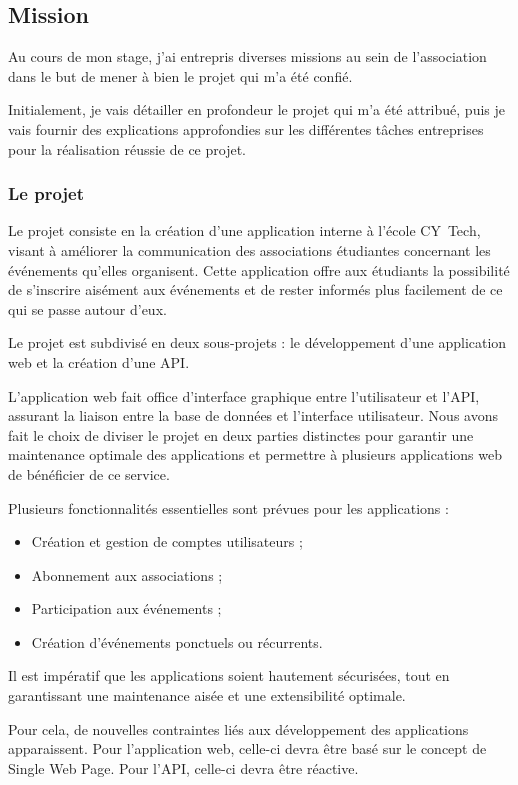 \subsection{Mission}

Au cours de mon stage, j'ai entrepris diverses missions au sein de l'association dans le but de mener à bien le projet qui m'a été confié.

Initialement, je vais détailler en profondeur le projet qui m'a été attribué, puis je vais fournir des explications approfondies sur les différentes tâches entreprises pour la réalisation réussie de ce projet.

\subsubsection{Le projet}

Le projet consiste en la création d'une application interne à l'école CY~Tech, visant à améliorer la communication des associations étudiantes concernant les événements qu'elles organisent. Cette application offre aux étudiants la possibilité de s'inscrire aisément aux événements et de rester informés plus facilement de ce qui se passe autour d'eux.

Le projet est subdivisé en deux sous-projets : le développement d'une application web et la création d'une API.

L'application web fait office d'interface graphique entre l'utilisateur et l'API, assurant la liaison entre la base de données et l'interface utilisateur. Nous avons fait le choix de diviser le projet en deux parties distinctes pour garantir une maintenance optimale des applications et permettre à plusieurs applications web de bénéficier de ce service.

Plusieurs fonctionnalités essentielles sont prévues pour les applications :
\begin{itemize}
	\item Création et gestion de comptes utilisateurs ;
	\item Abonnement aux associations ;
	\item Participation aux événements ;
	\item Création d'événements ponctuels ou récurrents.
\end{itemize}

Il est impératif que les applications soient hautement sécurisées, tout en garantissant une maintenance aisée et une extensibilité optimale.

Pour cela, de nouvelles contraintes liés aux développement des applications apparaissent.
Pour l'application web, celle-ci devra être basé sur le concept de Single Web Page. 
Pour l'API, celle-ci devra être réactive.

